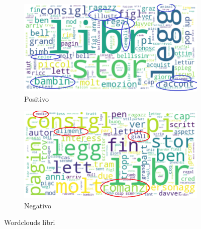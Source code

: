 			\begin{figure} 
				\centering
				\begin{subfigure}{0.48\textwidth}
					\includegraphics[width=\textwidth]{Figure/top_positive_books}
					\caption{Positivo}
					\label{fig:top_positive_books}
				\end{subfigure}
				\begin{subfigure}{0.48\textwidth}
					\includegraphics[width=\textwidth]{Figure/top_negative_books}
					\caption{Negativo}
					\label{fig:top_negative_books}
				\end{subfigure}
				\caption{Wordclouds libri}\label{fig:animals}
			\end{figure}
		
		